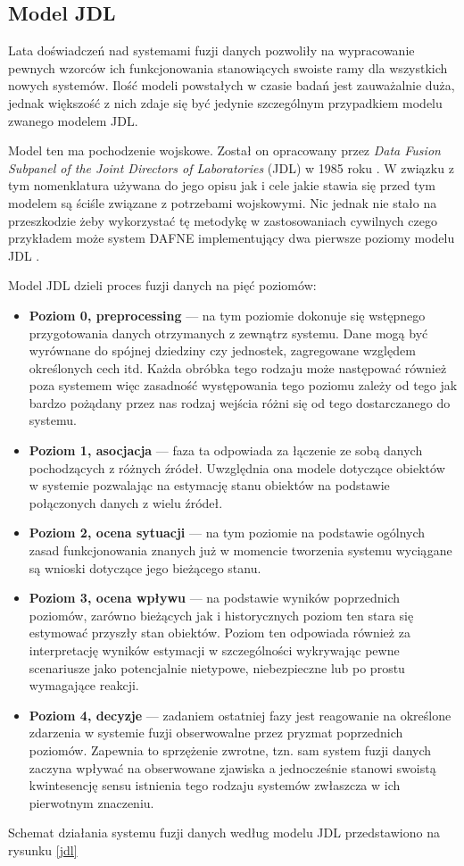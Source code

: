 \subsection{Model JDL}
\par{
Lata doświadczeń nad systemami fuzji danych pozwoliły na wypracowanie pewnych wzorców ich funkcjonowania stanowiących swoiste ramy dla wszystkich nowych systemów. Ilość modeli powstałych w czasie badań jest zauważalnie duża, jednak większość z nich zdaje się być jedynie szczególnym przypadkiem modelu zwanego modelem JDL.
}
\par{
Model ten ma pochodzenie wojskowe. Został on opracowany przez \textit{Data Fusion Subpanel of the Joint Directors of Laboratories} (JDL) w 1985 roku \cite{jdl}. W związku z tym nomenklatura używana do jego opisu jak i cele jakie stawia się przed tym modelem są ściśle związane z potrzebami wojskowymi. Nic jednak nie stało na przeszkodzie żeby wykorzystać tę metodykę w zastosowaniach cywilnych czego przykładem może system DAFNE implementujący dwa pierwsze poziomy modelu JDL \cite{DAFNEKlasyfikator}.
}
\par{
Model JDL dzieli proces fuzji danych na pięć poziomów:
\begin{itemize}
\renewcommand{\labelitemi}{}
\item \textbf{Poziom 0, preprocessing} --- na tym poziomie dokonuje się wstępnego przygotowania danych otrzymanych z zewnątrz systemu. Dane mogą być wyrównane do spójnej dziedziny czy jednostek, zagregowane względem określonych cech itd. Każda obróbka tego rodzaju może następować również poza systemem więc zasadność występowania tego poziomu zależy od tego jak bardzo pożądany przez nas rodzaj wejścia różni się od tego dostarczanego do systemu.
\item \textbf{Poziom 1, asocjacja} --- faza ta odpowiada za łączenie ze sobą danych pochodzących z różnych źródeł. Uwzględnia ona modele dotyczące obiektów w systemie pozwalając na estymację stanu obiektów na podstawie połączonych danych z wielu źródeł.
\item \textbf{Poziom 2, ocena sytuacji} --- na tym poziomie na podstawie ogólnych zasad funkcjonowania znanych już w momencie tworzenia systemu wyciągane są wnioski dotyczące jego bieżącego stanu.
\item \textbf{Poziom 3, ocena wpływu} --- na podstawie wyników poprzednich poziomów, zarówno bieżących jak i historycznych poziom ten stara się estymować przyszły stan obiektów. Poziom ten odpowiada również za interpretację wyników estymacji w szczególności wykrywając pewne scenariusze jako potencjalnie nietypowe, niebezpieczne lub po prostu wymagające reakcji.
\item \textbf{Poziom 4, decyzje} --- zadaniem ostatniej fazy jest reagowanie na określone zdarzenia w systemie fuzji obserwowalne przez pryzmat poprzednich poziomów. Zapewnia to sprzężenie zwrotne, tzn. sam system fuzji danych zaczyna wpływać na obserwowane zjawiska a jednocześnie stanowi swoistą kwintesencję sensu istnienia tego rodzaju systemów zwłaszcza w ich pierwotnym znaczeniu.
\end{itemize}
Schemat działania systemu fuzji danych według modelu JDL przedstawiono na rysunku \ref{jdl}
}

